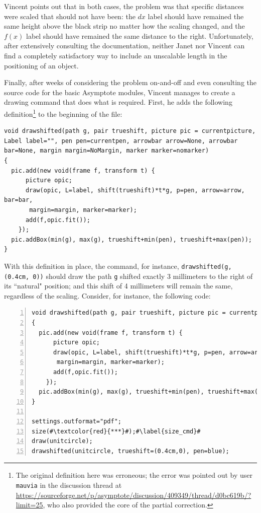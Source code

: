 \documentclass{article}
\begin{document}
Vincent points out that in both cases, the problem was that specific distances were scaled that 
should not have been: the $dx$ label should have remained the same height above the black strip no matter 
how the scaling changed, and the $f(x)$ label should have remained the same distance to the 
right.  Unfortunately, after extensively consulting the documentation, neither Janet nor Vincent 
can find a completely satisfactory way to include an unscalable length in the positioning of an object.

Finally, after weeks of considering the problem on-and-off and even consulting the source code for 
the basic Asymptote modules, Vincent manages to create a drawing command that does what is required.
First, he adds the following definition\footnote{The original definition here was erroneous; the error 
was pointed out by user \texttt{mauvia} in the discussion thread at 
\url{https://sourceforge.net/p/asymptote/discussion/409349/thread/d0bc619b/?limit=25}, who 
also provided the core of the partial correction.}
to the beginning of the file:
\begin{lstlisting}
void drawshifted(path g, pair trueshift, picture pic = currentpicture, Label label="", pen pen=currentpen, arrowbar arrow=None, arrowbar bar=None, margin margin=NoMargin, marker marker=nomarker)
{
  pic.add(new void(frame f, transform t) {
      picture opic;
      draw(opic, L=label, shift(trueshift)*t*g, p=pen, arrow=arrow, bar=bar,
	   margin=margin, marker=marker);
      add(f,opic.fit());
    });
  pic.addBox(min(g), max(g), trueshift+min(pen), trueshift+max(pen));
}
\end{lstlisting}
With this definition in place, the command, for instance, \lstinline!drawshifted(g, (0.4cm, 0))! should 
draw the path \lstinline!g! shifted exactly 3 millimeters to the right of its ``natural" position; and this 
shift of 4 millimeters will remain the same, regardless of the scaling.  Consider, for instance, the following 
code:
\begin{lstlisting}[escapechar=\#, numbers=left]
void drawshifted(path g, pair trueshift, picture pic = currentpicture, Label label="", pen pen=currentpen, arrowbar arrow=None, arrowbar bar=None, margin margin=NoMargin, marker marker=nomarker)
{
  pic.add(new void(frame f, transform t) {
      picture opic;
      draw(opic, L=label, shift(trueshift)*t*g, p=pen, arrow=arrow, bar=bar,
	   margin=margin, marker=marker);
      add(f,opic.fit());
    });
  pic.addBox(min(g), max(g), trueshift+min(pen), trueshift+max(pen));
}

settings.outformat="pdf";
size(#\textcolor{red}{***}#);#\label{size_cmd}#
draw(unitcircle);
drawshifted(unitcircle, trueshift=(0.4cm,0), pen=blue);
\end{lstlisting}
\end{document}
